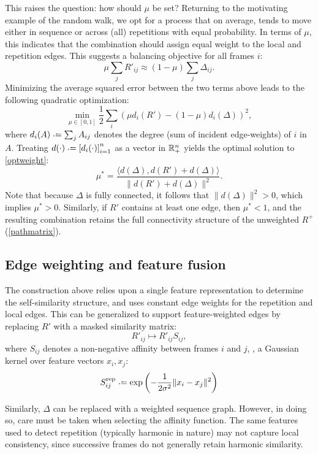\documentclass{article}
\begin{document}
This raises the question: how should $\mu$ be set?  Returning to the motivating
example of the random walk, we opt for a process that on average, tends to
move either in sequence or across (all) repetitions with equal probability.  In terms of
$\mu$, this indicates that the combination should assign equal weight to the local and
repetition edges.
This suggests a balancing objective for all frames $i$:
$$
\mu \sum_j R'_{ij} \approx (1-\mu) \sum_j \Delta_{ij}.
$$
Minimizing the average squared error between the two terms above leads to the
following quadratic optimization:
\begin{equation}
\min_{\mu \in [0, 1]} \frac{1}{2} \sum_i {(\mu d_i(R') - (1 - \mu)d_i(\Delta))}^2,\label{optweight}
\end{equation}
where $d_i(A) \defeq \sum_j A_{ij}$ denotes the degree (sum of incident edge-weights) 
of $i$ in $A$. Treating $d(\cdot) \defeq {[d_i(\cdot)]}_{i=1}^n$ as a vector in 
$\mathbb{R}^n_+$ yields the optimal solution to \cref{optweight}:
\begin{equation}
\mu^* = \frac{\langle d(\Delta), d(R') + d(\Delta)\rangle}{\|d(R') +
d(\Delta)\|^2}.\label{optweight:solution}
\end{equation}
Note that because $\Delta$ is fully connected, it follows that $\|d(\Delta)\|^2 > 0$,
which implies $\mu^* > 0$. Similarly, if $R'$ contains at least one edge, then 
$\mu^* < 1$, and the resulting combination retains the full connectivity structure of
the unweighted $R^+$ (\cref{pathmatrix}).

\subsection{Edge weighting and feature fusion}
The construction above relies upon a single feature representation to 
determine the self-similarity structure, and uses constant edge weights for the
repetition and local edges.  This can be generalized to support
feature-weighted edges by replacing $R'$ with a masked similarity matrix:
\begin{equation}
R'_{ij} \mapsto R'_{ij} S_{ij},
\end{equation}
where $S_{ij}$ denotes a non-negative affinity between frames $i$ and $j$, \eg,
a Gaussian kernel over feature vectors $x_i, x_j$:
\[
S^\text{rep}_{ij} \defeq \exp\left(-\frac{1}{2\sigma^2}\|x_i - x_j\|^2\right)
\]

Similarly, $\Delta$ can be replaced with a weighted sequence graph.  However, in doing so,
care must be taken when selecting the affinity function.  The same features used to detect 
repetition (typically harmonic in nature) may not capture local consistency, since 
successive frames do not generally retain harmonic similarity.  
\end{document}
